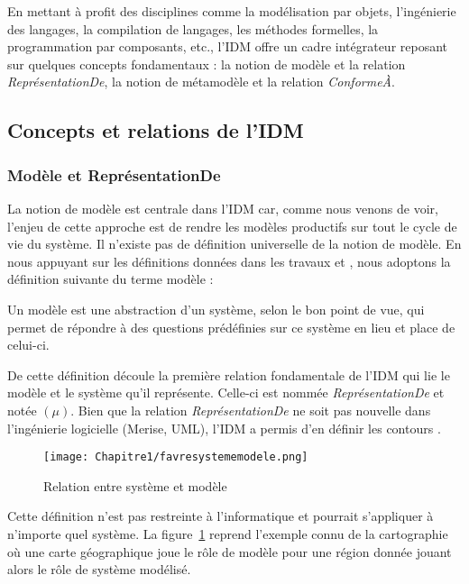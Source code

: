 En mettant à profit des disciplines comme la modélisation par objets, 
l'ingénierie des langages, la compilation de langages, les méthodes formelles, 
la programmation par composants, etc., l'IDM offre un cadre intégrateur reposant 
sur quelques concepts fondamentaux : la notion de modèle et la relation 
\textit{ReprésentationDe}, la notion de métamodèle et la relation 
\textit{ConformeÀ}.

\subsection{Concepts et relations de l'IDM}
\subsubsection{Modèle et ReprésentationDe}
La notion de modèle est centrale dans l'IDM car, comme nous venons de voir, 
l'enjeu de cette approche est de rendre les modèles productifs sur tout le cycle 
de vie du système. Il n'existe pas de définition universelle de la notion de 
modèle. En nous appuyant sur les définitions données dans les travaux 
\cite{minsky1967computation} \cite{bezivin2001towards} et 
\cite{seidewitz2003models}, nous adoptons la définition suivante du terme modèle 
:

\begin{theorem}
Un modèle est une abstraction d'un système, selon le bon point de vue, qui 
permet de répondre à des questions prédéfinies sur ce système en lieu et place 
de celui-ci.
\end{theorem}

De cette définition découle la première relation fondamentale de l'IDM qui lie 
le modèle et le système qu'il représente. Celle-ci est nommée 
\textit{ReprésentationDe} et notée $(\mu)$. Bien que la relation 
\textit{ReprésentationDe} ne soit pas nouvelle dans l'ingénierie logicielle 
(Merise, UML), l'IDM a permis d'en définir les contours \cite{atkinson2003model} 
\cite{seidewitz2003models} \cite{bezivin2004search}.

\begin{figure}[!htbp]
 \begin{center}
  \texttt{[image: Chapitre1/favresystememodele.png]}
 \end{center}
 \caption{Relation entre système et modèle \protect\cite{favre2006ingenierie}}
 \label{fig:systemModele}
\end{figure}

Cette définition n'est pas restreinte à l'informatique et pourrait s'appliquer à 
n'importe quel système. 
La figure~\ref{fig:systemModele} reprend l'exemple connu de la cartographie où 
une carte géographique joue le rôle de modèle pour une région donnée jouant 
alors le rôle de système modélisé. 

